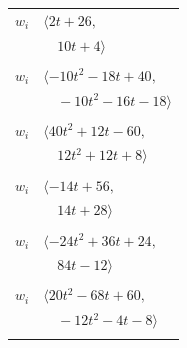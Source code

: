 \documentclass[11pt]{article}
\begin{document}
\begin{longtable}{@{}ll@{}}
$w_i$ & $\langle 2t+26,$\\
 & $\quad 10t+4\rangle$\\
\addlinespace[2pt]
\multicolumn{2}{@{}p{0.97\textwidth}@{}}{$i=21$, $D_i=1$, $\rho_{ij}$: $0{:}1, \allowbreak 2{:}2, \allowbreak 3{:}2, \allowbreak 8{:}2, \allowbreak 31{:}1, \allowbreak 35{:}1, \allowbreak 44{:}1, \allowbreak 48{:}2, \allowbreak 50{:}2, \allowbreak 52{:}1$}\\
$w_i$ & $\langle -10t^{2}-18t+40,$\\
 & $\quad -10t^{2}-16t-18\rangle$\\
\addlinespace[2pt]
\multicolumn{2}{@{}p{0.97\textwidth}@{}}{$i=22$, $D_i=4$, $\rho_{ij}$: $2{:}2, \allowbreak 5{:}1, \allowbreak 7{:}1, \allowbreak 8{:}2, \allowbreak 11{:}2, \allowbreak 17{:}2, \allowbreak 18{:}1, \allowbreak 29{:}1, \allowbreak 35{:}1, \allowbreak 51{:}1$}\\
$w_i$ & $\langle 40t^{2}+12t-60,$\\
 & $\quad 12t^{2}+12t+8\rangle$\\
\addlinespace[2pt]
\multicolumn{2}{@{}p{0.97\textwidth}@{}}{$i=23$, $D_i=2$, $\rho_{ij}$: $6{:}1, \allowbreak 11{:}2, \allowbreak 33{:}1, \allowbreak 37{:}1, \allowbreak 43{:}1, \allowbreak 44{:}1$}\\
$w_i$ & $\langle -14t+56,$\\
 & $\quad 14t+28\rangle$\\
\addlinespace[2pt]
\multicolumn{2}{@{}p{0.97\textwidth}@{}}{$i=24$, $D_i=2$, $\rho_{ij}$: $1{:}1, \allowbreak 2{:}1, \allowbreak 3{:}2, \allowbreak 4{:}1, \allowbreak 15{:}2, \allowbreak 16{:}1, \allowbreak 18{:}1, \allowbreak 32{:}1, \allowbreak 45{:}1, \allowbreak 49{:}1, \allowbreak 50{:}2, \allowbreak 53{:}2$}\\
$w_i$ & $\langle -24t^{2}+36t+24,$\\
 & $\quad 84t-12\rangle$\\
\addlinespace[2pt]
\multicolumn{2}{@{}p{0.97\textwidth}@{}}{$i=25$, $D_i=4$, $\rho_{ij}$: $0{:}1, \allowbreak 4{:}1, \allowbreak 8{:}2, \allowbreak 12{:}1, \allowbreak 28{:}2, \allowbreak 32{:}2, \allowbreak 47{:}2, \allowbreak 50{:}1, \allowbreak 51{:}1, \allowbreak 52{:}1, \allowbreak 54{:}2$}\\
$w_i$ & $\langle 20t^{2}-68t+60,$\\
 & $\quad -12t^{2}-4t-8\rangle$\\
\addlinespace[2pt]
\multicolumn{2}{@{}p{0.97\textwidth}@{}}{$i=26$, $D_i=2$, $\rho_{ij}$: $0{:}2, \allowbreak 1{:}2, \allowbreak 3{:}2, \allowbreak 4{:}1, \allowbreak 12{:}2, \allowbreak 37{:}2, \allowbreak 44{:}2, \allowbreak 45{:}1, \allowbreak 46{:}1, \allowbreak 47{:}2, \allowbreak 49{:}2$}\\

\end{longtable}
\end{document}
